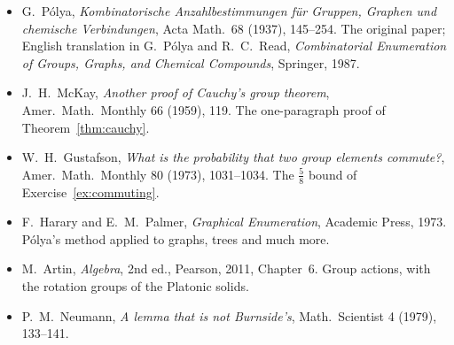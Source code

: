 \begin{itemize}
\item G.~P\'olya, \emph{Kombinatorische Anzahlbestimmungen f\"ur Gruppen, Graphen und chemische Verbindungen}, Acta Math.\ 68 (1937), 145--254. The original paper; English translation in G.~P\'olya and R.~C.~Read, \emph{Combinatorial Enumeration of Groups, Graphs, and Chemical Compounds}, Springer, 1987.
\item J.~H.~McKay, \emph{Another proof of Cauchy's group theorem}, Amer.\ Math.\ Monthly 66 (1959), 119. The one-paragraph proof of Theorem~\ref{thm:cauchy}.
\item W.~H.~Gustafson, \emph{What is the probability that two group elements commute?}, Amer.\ Math.\ Monthly 80 (1973), 1031--1034. The $\frac58$ bound of Exercise~\ref{ex:commuting}.
\item F.~Harary and E.~M.~Palmer, \emph{Graphical Enumeration}, Academic Press, 1973. P\'olya's method applied to graphs, trees and much more.
\item M.~Artin, \emph{Algebra}, 2nd ed., Pearson, 2011, Chapter~6. Group actions, with the rotation groups of the Platonic solids.
\item P.~M.~Neumann, \emph{A lemma that is not Burnside's}, Math.\ Scientist 4 (1979), 133--141.
\end{itemize}
